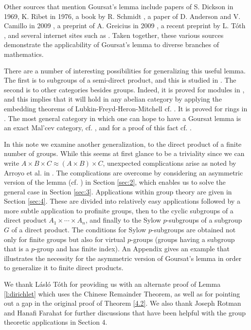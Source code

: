 \documentclass[11pt]{article}
\theoremstyle{change}
\newcommand{\<}{\langle}
\renewcommand{\>}{\rangle}
\begin{document}
Other sources that mention Goursat's lemma include papers of S. Dickson \cite{Dickson} in 1969, K. Ribet \cite{Ribet} in 1976, a book by R. Schmidt \cite[Chapter 1.6]{Schmidt}, a paper of D. Anderson and V. Camillo in 2009 \cite{Anderson1}, a preprint of A. Greicius in 2009 \cite{Greicius}, a recent preprint by L. T\'oth \cite{Toth},  and several internet sites such as \cite{mathforum,poster}. Taken together, these various sources demonstrate the applicability of Goursat's
lemma to diverse branches of mathematics.

There are a number of interesting possibilities for generalizing this useful lemma. The first is to subgroups of a semi-direct product, and this is studied in \cite{Usenko}. The second is to other categories besides groups. Indeed, it is proved for modules in \cite {Lambek1}, and this implies that it will hold in any abelian category by applying the embedding theorems of Lubkin-Freyd-Heron-Mitchell cf. \cite[p. 205]{Maclane}. It is proved for rings in \cite{Anderson1}. The most general category in which one can hope to have a Goursat lemma is  an exact Mal'cev category, cf. \cite{mathforum}, and for a proof of this fact cf. \cite[Theorem 5.7]{Carboni}.

In this note we examine another generalization, to the direct product of a finite number of groups. While this seems at first glance to be a triviality since we can write $A\times B\times C\approx (A\times B)\times C$, unexpected complications arise as noted by Arroyo et al. in \cite{poster}. The complications are overcome by considering an asymmetric version of the lemma (cf. \cite{Schmidt}) in Section \ref{sec:2}, which enables us to solve the general case in Section \ref{sec:3}.   Applications within group theory are
given in Section \ref{sec:4}. These are divided into relatively easy applications followed by a
more subtle application to profinite groups, then to the  cyclic subgroups of a direct product $A_1\times \cdots \times A_n$, and finally to the Sylow $p$-subgroups of a subgroup $G$  of a direct product. The conditions for Sylow $p$-subgroups are obtained not only for finite
groups but also for virtual $p$-groups  (groups having a subgroup that is a $p$-group and has finite index). 
An Appendix gives an example that illustrates the necessity for the  
asymmetric version of Goursat's lemma in order to generalize it to finite direct products.

    We thank L\'asl\'o T\'oth for providing us with an alternate proof of Lemma \ref{l:dirichlet} which uses the Chinese Remainder Theorem, as well as for pointing out a gap in the original proof of Theorem \ref{4.2}. We also thank Joseph Rotman and Hanafi 
Farahat for further
discussions that have been helpful with the group theoretic applications in Section 4.
 
\end{document}
